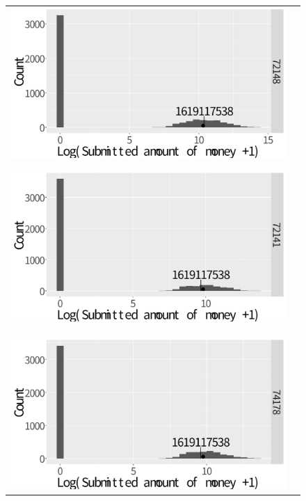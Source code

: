\documentclass[dvipdfmx, english]{ampmt}             %
\begin{document}
\begin{figure}[H]
	\begin{tabular}{cc}
	\begin{minipage}{.5\hsize}
	\centering
	\centerline{\includegraphics[scale=0.22]{../img/fraud/Diagnostic-Radiology-72148.pdf}}
	\subcaption{}\label{fig:Diagnostic1}
	\end{minipage} 
      \begin{minipage}{.5\hsize}
        \centering
        \centerline{\includegraphics[scale=0.22]{../img/fraud/Diagnostic-Radiology-72141.pdf}}
	\subcaption{}\label{fig:Diagnostic2}
      \end{minipage} \\
       \begin{minipage}{.5\hsize}
        \centering
        \centerline{\includegraphics[scale=0.22]{../img/fraud/Diagnostic-Radiology-74178.pdf}}

\end{minipage}
\end{tabular}
\end{figure}
\end{document}

